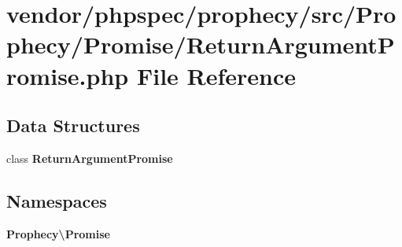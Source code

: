 \section{vendor/phpspec/prophecy/src/\+Prophecy/\+Promise/\+Return\+Argument\+Promise.php File Reference}
\label{_return_argument_promise_8php}
\subsection*{Data Structures}
\begin{DoxyCompactItemize}
\item 
class {\bf Return\+Argument\+Promise}
\end{DoxyCompactItemize}
\subsection*{Namespaces}
\begin{DoxyCompactItemize}
\item 
 {\bf Prophecy\textbackslash{}\+Promise}
\end{DoxyCompactItemize}

